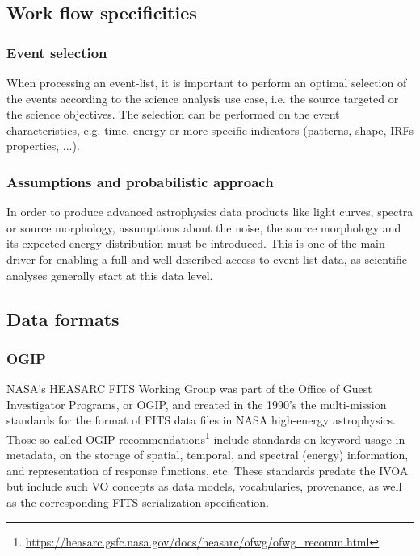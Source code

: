 \documentclass[11pt,a4paper]{ivoa}
\begin{document}
\subsection{Work flow specificities}

\subsubsection{Event selection}

When processing an event-list, it is important to perform an optimal selection of the events according to the science
analysis use case, i.e.  the source targeted or the science objectives. The selection can be performed on the event
characteristics, e.g. time, energy or more specific indicators (patterns, shape, IRFs properties, ...).

\subsubsection{Assumptions and probabilistic approach}

In order to produce advanced astrophysics data products like light curves, spectra or source morphology, assumptions
about the noise, the source morphology and its expected energy distribution must be introduced. This is one of the main
driver for enabling a full and well described access to event-list data, as scientific analyses generally start at this data level.


\subsection{Data formats}
\label{sec:data_formats}

\subsubsection{{OGIP}}\label{sec:ogip}

NASA's HEASARC FITS Working Group was part of the Office of Guest Investigator Programs, or OGIP, and created in the 1990's the multi-mission standards for the format of FITS data files in NASA high-energy astrophysics. Those so-called OGIP  recommendations\footnote{\url{https://heasarc.gsfc.nasa.gov/docs/heasarc/ofwg/ofwg_recomm.html}} include standards on keyword usage in metadata, on the storage of spatial, temporal, and spectral (energy) information, and representation of response functions, etc.  These standards predate the IVOA but include such VO concepts as data models, vocabularies, provenance, as well as the corresponding FITS serialization specification.
\end{document}
